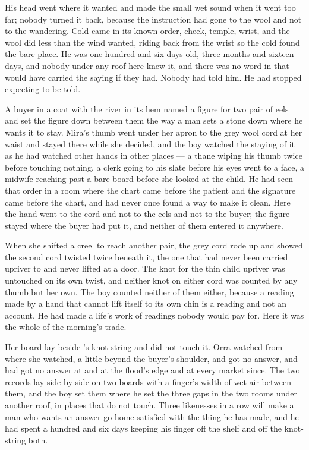 His head went where it wanted and made the small wet sound when it went too far; nobody turned it back, because the instruction had gone to the wool and not to the wandering. Cold came in its known order, cheek, temple, wrist, and the wool did less than the wind wanted, riding back from the wrist so the cold found the bare place. He was one hundred and six days old, three months and sixteen days, and nobody under any roof here knew it, and there was no word in  that would have carried the saying if they had. Nobody had told him. He had stopped expecting to be told.

\scenebreak

A buyer in a coat with the river in its hem named a figure for two pair of eels and set the figure down between them the way a man sets a stone down where he wants it to stay. Mira's thumb went under her apron to the grey wool cord at her waist and stayed there while she decided, and the boy watched the staying of it as he had watched other hands in other places --- a thane wiping his thumb twice before touching nothing, a clerk going to his slate before his eyes went to a face, a midwife reaching past a bare board before she looked at the child. He had seen that order in a room where the chart came before the patient and the signature came before the chart, and had never once found a way to make it clean. Here the hand went to the cord and not to the eels and not to the buyer; the figure stayed where the buyer had put it, and neither of them entered it anywhere.

When she shifted a creel to reach another pair, the grey cord rode up and showed the second cord twisted twice beneath it, the one that had never been carried upriver to  and never lifted at a door. The knot for the thin child upriver was untouched on its own twist, and neither knot on either cord was counted by any thumb but her own. The boy counted neither of them either, because a reading made by a hand that cannot lift itself to its own chin is a reading and not an account. He had made a life's work of readings nobody would pay for. Here it was the whole of the morning's trade.

Her board lay beside 's knot-string and did not touch it. Orra watched from where she watched, a little beyond the buyer's shoulder, and got no answer, and had got no answer at  and at the flood's edge and at every market since. The two records lay side by side on two boards with a finger's width of wet air between them, and the boy set them where he set the three gaps in the two rooms under another roof, in places that do not touch. Three likenesses in a row will make a man who wants an answer go home satisfied with the thing he has made, and he had spent a hundred and six days keeping his finger off the shelf and off the knot-string both.

